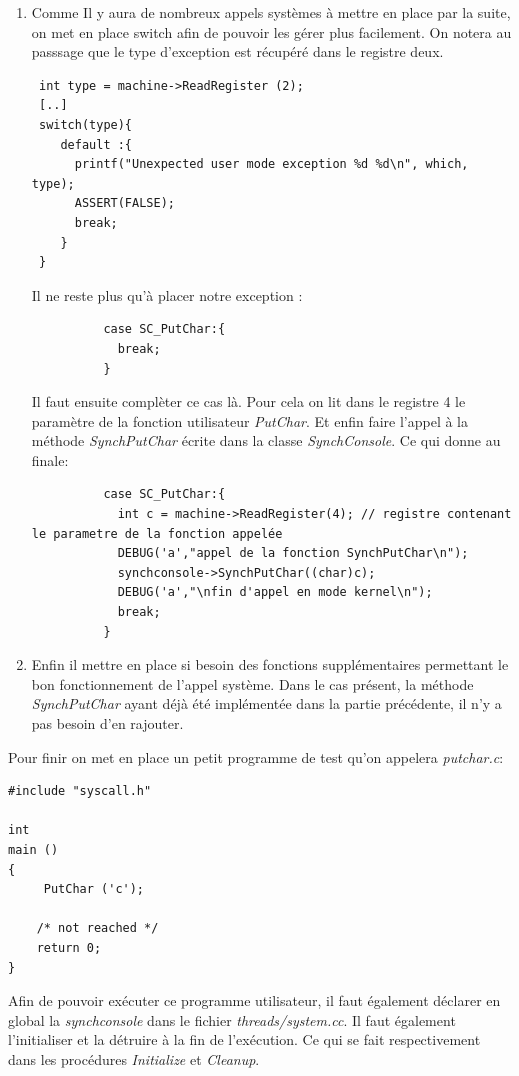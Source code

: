\documentclass[a4paper,10pt]{report}
\begin{document}
\begin{enumerate}
  \item  Comme Il y aura de nombreux appels systèmes à mettre en place par la suite, on met en place switch afin de pouvoir les gérer plus facilement. 
  On notera au passsage que le type d'exception est récupéré dans le registre deux. 
\begin{lstlisting}
 int type = machine->ReadRegister (2);
 [..]
 switch(type){
    default :{
      printf("Unexpected user mode exception %d %d\n", which, type);
      ASSERT(FALSE);
      break;
    }
 }
\end{lstlisting}
  Il ne reste plus qu'à placer notre exception :
  \begin{lstlisting}
          case SC_PutChar:{
            break;
          }   
  \end{lstlisting}
 Il faut ensuite complèter ce cas là. Pour cela on lit dans le registre 4 le paramètre de la fonction utilisateur \emph{PutChar}. Et enfin faire l'appel
 à la méthode \emph{SynchPutChar} écrite dans la classe \emph{SynchConsole}. Ce qui donne au finale:
 \newpage
 \begin{lstlisting}
          case SC_PutChar:{
            int c = machine->ReadRegister(4); // registre contenant le parametre de la fonction appelée
            DEBUG('a',"appel de la fonction SynchPutChar\n");
            synchconsole->SynchPutChar((char)c);
            DEBUG('a',"\nfin d'appel en mode kernel\n");
            break;
          }  
 \end{lstlisting}
  \item Enfin il mettre en place si besoin des fonctions supplémentaires permettant le bon fonctionnement de l'appel système. Dans le cas présent, la méthode
  \emph{SynchPutChar} ayant déjà été implémentée dans la partie précédente, il n'y a pas besoin d'en rajouter.
  \end{enumerate}

  Pour finir on met en place un petit programme de test qu'on appelera \emph{putchar.c}:
  \begin{lstlisting}
#include "syscall.h"

int
main ()
{
     PutChar ('c');

    /* not reached */
    return 0;
}   
  \end{lstlisting}
  Afin de pouvoir exécuter ce programme utilisateur, il faut également déclarer en global la \emph{synchconsole} dans le fichier \emph{threads/system.cc}. Il 
  faut également l'initialiser et la détruire à la fin de l'exécution. Ce qui se fait respectivement dans les procédures \emph{Initialize} et \emph{Cleanup}.
  
\end{document}
